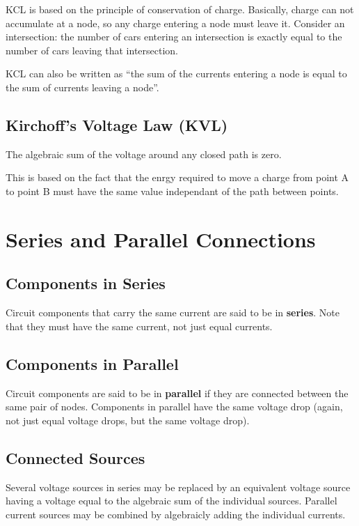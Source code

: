 \documentclass[12pt]{article}
\begin{document}
KCL is based on the principle of conservation of charge. Basically, charge can not accumulate at a node, so any charge entering a node must leave it. Consider an intersection: the number of cars entering an intersection is exactly equal to the number of cars leaving that intersection.

KCL can also be written as ``the sum of the currents entering a node is equal to the sum of currents leaving a node''.

\subsection*{Kirchoff's Voltage Law (KVL)}
\begin{theorem}[KVL]
The algebraic sum of the voltage around any closed path is zero.
\end{theorem}

This is based on the fact that the enrgy required to move a charge from point A to point B must have the same value independant of the path between points.

\section*{Series and Parallel Connections}
\subsection*{Components in Series}
Circuit components that carry the same current are said to be in {\bf series}. Note that they must have the same current, not just equal currents.

\subsection*{Components in Parallel}
Circuit components are said to be in {\bf parallel} if they are connected between the same pair of nodes. Components in parallel have the same voltage drop (again, not just equal voltage drops, but the same voltage drop).

\subsection*{Connected Sources}
Several voltage sources in series may be replaced by an equivalent voltage source having a voltage equal to the algebraic sum of the individual sources. Parallel current sources may be combined by algebraicly adding the individual currents.
\end{document}
